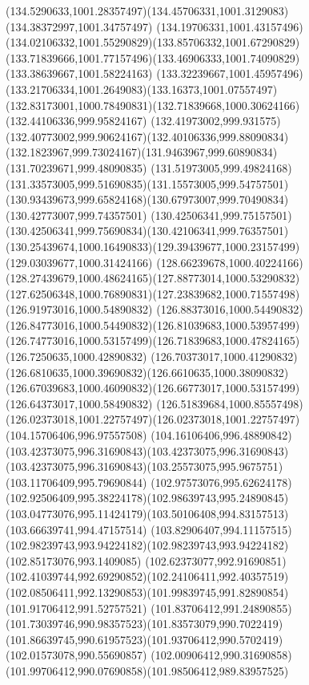 {{		\curveto(134.5290633,1001.28357497)(134.45706331,1001.3129083)(134.38372997,1001.34757497)
		\curveto(134.19706331,1001.43157496)(134.02106332,1001.55290829)(133.85706332,1001.67290829)
		\curveto(133.71839666,1001.77157496)(133.46906333,1001.74090829)(133.38639667,1001.58224163)
		\curveto(133.32239667,1001.45957496)(133.21706334,1001.2649083)(133.16373,1001.07557497)
		\curveto(132.83173001,1000.78490831)(132.71839668,1000.30624166)(132.44106336,999.95824167)
		\curveto(132.41973002,999.931575)(132.40773002,999.90624167)(132.40106336,999.88090834)
		\curveto(132.1823967,999.73024167)(131.9463967,999.60890834)(131.70239671,999.48090835)
		\curveto(131.51973005,999.49824168)(131.33573005,999.51690835)(131.15573005,999.54757501)
		\curveto(130.93439673,999.65824168)(130.67973007,999.70490834)(130.42773007,999.74357501)
		\curveto(130.42506341,999.75157501)(130.42506341,999.75690834)(130.42106341,999.76357501)
		\curveto(130.25439674,1000.16490833)(129.39439677,1000.23157499)(129.03039677,1000.31424166)
		\curveto(128.66239678,1000.40224166)(128.27439679,1000.48624165)(127.88773014,1000.53290832)
		\curveto(127.62506348,1000.76890831)(127.23839682,1000.71557498)(126.91973016,1000.54890832)
		\curveto(126.88373016,1000.54490832)(126.84773016,1000.54490832)(126.81039683,1000.53957499)
		\curveto(126.74773016,1000.53157499)(126.71839683,1000.47824165)(126.7250635,1000.42890832)
		\curveto(126.70373017,1000.41290832)(126.6810635,1000.39690832)(126.6610635,1000.38090832)
		\curveto(126.67039683,1000.46090832)(126.66773017,1000.53157499)(126.64373017,1000.58490832)
		\curveto(126.51839684,1000.85557498)(126.02373018,1001.22757497)(126.02373018,1001.22757497)
		\lineto(104.15706406,996.97557508)
		\curveto(104.16106406,996.48890842)(103.42373075,996.31690843)(103.42373075,996.31690843)
		\curveto(103.42373075,996.31690843)(103.25573075,995.9675751)(103.11706409,995.79690844)
		\curveto(102.97573076,995.62624178)(102.92506409,995.38224178)(102.98639743,995.24890845)
		\curveto(103.04773076,995.11424179)(103.50106408,994.83157513)(103.66639741,994.47157514)
		\curveto(103.82906407,994.11157515)(102.98239743,993.94224182)(102.98239743,993.94224182)
		\lineto(102.85173076,993.1409085)
		\curveto(102.62373077,992.91690851)(102.41039744,992.69290852)(102.24106411,992.40357519)
		\curveto(102.08506411,992.13290853)(101.99839745,991.82890854)(101.91706412,991.52757521)
		\curveto(101.83706412,991.24890855)(101.73039746,990.98357523)(101.83573079,990.7022419)
		\curveto(101.86639745,990.61957523)(101.93706412,990.5702419)(102.01573078,990.55690857)
		\curveto(102.00906412,990.31690858)(101.99706412,990.07690858)(101.98506412,989.83957525)
}}
